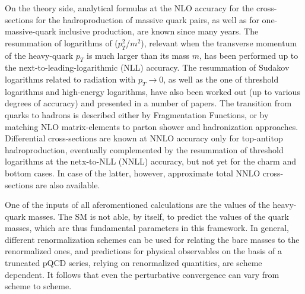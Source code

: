 \documentclass[12pt,a4paper]{article}
\begin{document}



On the theory side, analytical formulas at the NLO accuracy for the cross-sections for the hadroproduction of massive quark pairs, as well as for one-massive-quark inclusive production, are known since many years. The resummation of logarithms of ($p_T^2$/$m^2$), relevant when the transverse momentum of the heavy-quark $p_T$ is much larger than its mass $m$, has been performed up to the next-to-leading-logarithmic (NLL) accuracy. The resummation of Sudakov logarithms related to radiation with $p_T \rightarrow 0$, as well as the one of threshold logarithms and high-energy logarithms, have also been worked out (up to various degrees of accuracy) and presented in a number of papers.   
The transition from quarks to hadrons is described either by Fragmentation Functions, or by matching NLO matrix-elements to parton shower and hadronization approaches. 
Differential cross-sections are known at NNLO accuracy only for top-antitop hadroproduction, eventually complemented by the resummation of threshold logarithms at the netx-to-NLL (NNLL) accuracy, but not yet for the charm and bottom cases. 
In case of the latter, however, approximate total NNLO cross-sections are also available.
 
One of the inputs of all aferomentioned calculations are the values of the heavy-quark masses.
The SM is not able, by itself, to predict the values of the quark masses, which
are thus fundamental parameters in this framework.  
In general, different renormalization schemes can be used for relating the bare masses
to the renormalized ones, and predictions for physical observables on the basis of a truncated pQCD series, relying on renormalized quantities, are scheme dependent. It follows that even the perturbative convergence can vary from scheme
to scheme. 
\end{document}
